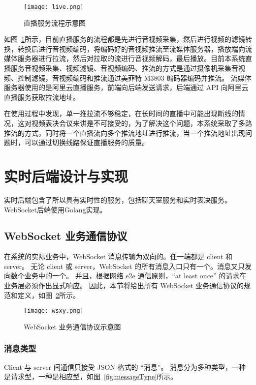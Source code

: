   \begin{figure}[!htp]
    \centering
    \texttt{[image: live.png]}
    \caption{直播服务流程示意图}
    \label{fig:live}
  \end{figure}

  如图~\ref{fig:live}所示，目前直播服务的流程都是先进行音视频采集，然后进行视频的滤镜转换，转换后进行音视频编码，将编码好的音视频推流至流媒体服务器，播放端向流媒体服务器进行拉流，然后对拉取的流进行音视频解码，最后播放。目前本系统直播服务音视频采集、视频滤镜、音视频编码、推流的方式是通过摄像机采集音视频、控制滤镜，音视频编码和推流通过美菲特 M3803 编码器编码并推流。
  流媒体服务器使用的是阿里云直播服务，前端向后端发送请求，后端通过 API 向阿里云直播服务获取拉流地址。

  在使用过程中发现，单一推拉流不够稳定，在长时间的直播中可能出现断线的情况，这对视频表决会议来讲是不可接受的，为了解决这个问题，本系统采取了多路推流的方式，同时将一个直播流向多个推流地址进行推流，当一个推流地址出现问题时，可以通过切换线路保证直播服务的质量。

  \section{实时后端设计与实现}
  实时后端包含了所以具有实时性的服务，包括聊天室服务和实时表决服务。WebSocket后端使用Golang实现。

  \subsection{WebSocket 业务通信协议}
  在系统的实际业务中，WebSocket 消息传输为双向的。任一端都是 client 和 server。
无论 client 或 server，WebSocket 的所有消息入口只有一个。消息又只发向数个业务中的一个。
并且，根据网络 e2e 通信原则，“at least once” 的请求在业务层必须作出显式响应。
因此，本节将给出所有 WebSocket 业务通信协议的规范和定义，如图~\ref{fig:wsxy}所示。

\begin{figure}[!htp]
    \centering
    \texttt{[image: wsxy.png]}
    \caption{WebSocket 业务通信协议示意图}
    \label{fig:wsxy}
  \end{figure}

  \subsubsection{消息类型}
  Client 与 server 间通信只接受 JSON 格式的 “消息”。
  消息分为多种类型，一种是请求型，一种是相应型，如图~\ref{fig:messageType}所示。
  

